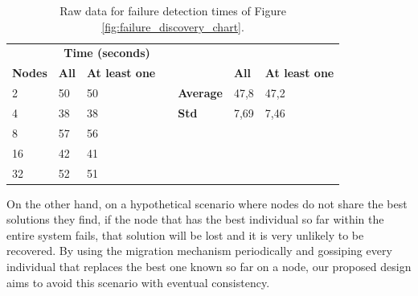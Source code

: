 \begin{table}[h!]
\centering
\begin{tabular}{l|l|l|llll}
\cline{2-3}
                                     & \multicolumn{2}{c|}{\textbf{Time (seconds)}} &                       &                                       & \multicolumn{2}{c}{\textbf{}}                                                  \\ \cline{1-3} \cline{6-7} 
\multicolumn{1}{|l|}{\textbf{Nodes}} & \textbf{All}     & \textbf{At least one}     &                       & \multicolumn{1}{r|}{\textbf{}}        & \multicolumn{1}{l|}{\textbf{All}} & \multicolumn{1}{l|}{\textbf{At least one}} \\ \cline{1-3} \cline{5-7} 
\multicolumn{1}{|l|}{2}              & 50               & 50                        & \multicolumn{1}{l|}{} & \multicolumn{1}{r|}{\textbf{Average}} & \multicolumn{1}{l|}{47,8}         & \multicolumn{1}{l|}{47,2}                  \\ \cline{1-3} \cline{5-7} 
\multicolumn{1}{|l|}{4}              & 38               & 38                        & \multicolumn{1}{l|}{} & \multicolumn{1}{l|}{\textbf{Std}}     & \multicolumn{1}{l|}{7,69}         & \multicolumn{1}{l|}{7,46}                  \\ \cline{1-3} \cline{5-7} 
\multicolumn{1}{|l|}{8}              & 57               & 56                        &                       &                                       &                                   &                                            \\ \cline{1-3}
\multicolumn{1}{|l|}{16}             & 42               & 41                        &                       &                                       &                                   &                                            \\ \cline{1-3}
\multicolumn{1}{|l|}{32}             & 52               & 51                        &                       &                                       &                                   &                                            \\ \cline{1-3}
\end{tabular}
\caption{Raw data for failure detection times of Figure \ref{fig:failure_discovery_chart}.}
\label{tab:failure_discovery_table}
\end{table}

On the other hand, on a hypothetical scenario where nodes do not share the best solutions they find, if the node that has the best individual so far within the entire system fails, that solution will be lost and it is very unlikely to be recovered. By using the migration mechanism periodically and gossiping every individual that replaces the best one known so far on a node, our proposed design aims to avoid this scenario with eventual consistency.

